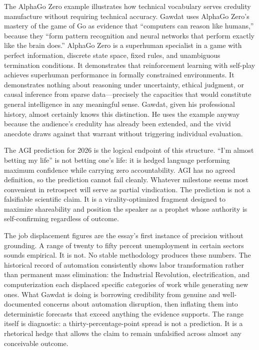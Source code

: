 \documentclass[12pt, a4paper]{article}
\begin{document}
The AlphaGo Zero example illustrates how technical vocabulary serves credulity manufacture without
requiring technical accuracy. Gawdat uses AlphaGo Zero's mastery of the game of Go as evidence
that ``computers can reason like humans,'' because they ``form pattern recognition and neural
networks that perform exactly like the brain does.'' AlphaGo Zero is a superhuman specialist in a
game with perfect information, discrete state space, fixed rules, and unambiguous termination
conditions. It demonstrates that reinforcement learning with self-play achieves superhuman
performance in formally constrained environments. It demonstrates nothing about reasoning under
uncertainty, ethical judgment, or causal inference from sparse data---precisely the capacities that
would constitute general intelligence in any meaningful sense. Gawdat, given his professional
history, almost certainly knows this distinction. He uses the example anyway because the audience's
credulity has already been extended, and the vivid anecdote draws against that warrant without
triggering individual evaluation.

The AGI prediction for 2026 is the logical endpoint of this structure. ``I'm almost betting my
life'' is not betting one's life: it is hedged language performing maximum confidence while carrying
zero accountability. AGI has no agreed definition, so the prediction cannot fail cleanly. Whatever
milestone seems most convenient in retrospect will serve as partial vindication. The prediction is
not a falsifiable scientific claim. It is a virality-optimized fragment designed to maximize
shareability and position the speaker as a prophet whose authority is self-confirming regardless of
outcome.

The job displacement figures are the essay's first instance of precision without grounding. A range
of twenty to fifty percent unemployment in certain sectors sounds empirical. It is not. No stable
methodology produces these numbers. The historical record of automation consistently shows labor
transformation rather than permanent mass elimination: the Industrial Revolution, electrification,
and computerization each displaced specific categories of work while generating new ones. What
Gawdat is doing is borrowing credibility from genuine and well-documented concerns about automation
disruption, then inflating them into deterministic forecasts that exceed anything the evidence
supports. The range itself is diagnostic: a thirty-percentage-point spread is not a prediction. It
is a rhetorical hedge that allows the claim to remain unfalsified across almost any conceivable
outcome.
\end{document}
